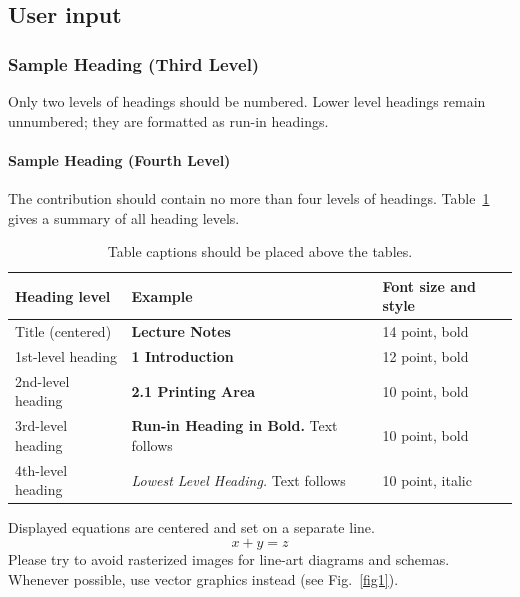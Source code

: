 \documentclass[runningheads]{llncs}
\begin{document}
\subsection{User input}



\subsubsection{Sample Heading (Third Level)} Only two levels of
headings should be numbered. Lower level headings remain unnumbered;
they are formatted as run-in headings.

\paragraph{Sample Heading (Fourth Level)}
The contribution should contain no more than four levels of
headings. Table~\ref{tab1} gives a summary of all heading levels.

\begin{table}
\caption{Table captions should be placed above the
tables.}\label{tab1}
\begin{tabular}{|l|l|l|}
\hline
Heading level &  Example & Font size and style\\
\hline
Title (centered) &  {\Large\bfseries Lecture Notes} & 14 point, bold\\
1st-level heading &  {\large\bfseries 1 Introduction} & 12 point, bold\\
2nd-level heading & {\bfseries 2.1 Printing Area} & 10 point, bold\\
3rd-level heading & {\bfseries Run-in Heading in Bold.} Text follows & 10 point, bold\\
4th-level heading & {\itshape Lowest Level Heading.} Text follows & 10 point, italic\\
\hline
\end{tabular}
\end{table}


\noindent Displayed equations are centered and set on a separate
line.
\begin{equation}
x + y = z
\end{equation}
Please try to avoid rasterized images for line-art diagrams and
schemas. Whenever possible, use vector graphics instead (see
Fig.~\ref{fig1}).
\end{document}
